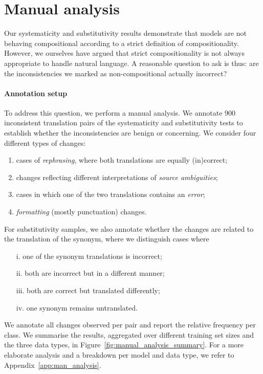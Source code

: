 \section{Manual analysis}
\label{sec:manual_analysis}

Our systematicity and substitutivity results demonstrate that models are not behaving compositional according to a strict definition of compositionality.
However, we ourselves have argued that strict compositionality is not always appropriate to handle natural language.
A reasonable question to ask is thus: are the inconsistencies we marked as non-compositional actually incorrect?

\paragraph{Annotation setup} 
To address this question, we perform a manual analysis.
We annotate 900 inconsistent translation pairs of the systematicity and substitutivity tests to establish whether the inconsistencies are benign or concerning.
We consider four different types of changes:
\begin{enumerate}[noitemsep,topsep=0pt]
\item cases of \textit{rephrasing}, where both translations are equally (in)correct;
\item changes reflecting different interpretations of \textit{source ambiguities};
\item cases in which one of the two translations contains an \textit{error};
\item \textit{formatting} (mostly punctuation) changes.
\end{enumerate}
For substitutivity samples, we also annotate whether the changes are related to the translation of the synonym, where we distinguish cases where
\begin{enumerate}[noitemsep,topsep=0pt]
\item[i.] one of the synonym translations is incorrect;
\item[ii.] both are incorrect but in a different manner;
\item[iii.] both are correct but translated differently;
\item[iv.] one synonym remains untranslated.
\end{enumerate}
We annotate all changes observed per pair and report the relative frequency per class. 
We summarise the results, aggregated over different training set sizes and the three data types, in Figure~\ref{fig:manual_analysis_summary}.
For a more elaborate analysis and a breakdown per model and data type, we refer to Appendix~\ref{app:man_analysis}.

